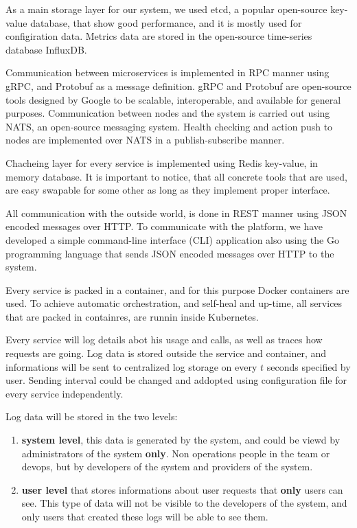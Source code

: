 As a main storage layer for our system, we used etcd, a popular open-source key-value database, that show good performance, and it is mostly used for configiration data. Metrics data are stored in the open-source time-series database InfluxDB. 

Communication between microservices is implemented in RPC manner using gRPC, and Protobuf as a message definition. gRPC and Protobuf are open-source tools designed by Google to be scalable, interoperable, and available for general purposes. Communication between nodes and the system is carried out using NATS, an open-source messaging system. Health checking and action push to nodes are implemented over NATS in a publish-subscribe manner.

Chacheing layer for every service is implemented using Redis key-value, in memory database. It is important to notice, that all concrete tools that are used, are easy swapable for some other as long as they implement proper interface.

All communication with the outside world, is done in REST manner using JSON encoded messages over HTTP. To communicate with the platform, we have developed a simple command-line interface (CLI) application also using the Go programming language that sends JSON encoded messages over HTTP to the system.

Every service is packed in a container, and for this purpose Docker containers are used. To achieve automatic orchestration, and self-heal and up-time, all services that are packed in containres, are runnin inside Kubernetes.

Every service will log details abot his usage and calls, as well as traces how requests are going. Log data is stored outside the service and container, and informations will be sent to centralized log storage on every $t$ seconds specified by user. Sending interval could be changed and addopted using configuration file for every service independently.

Log data will be stored in the two levels:

\begin{enumerate}[start=1,label={(\bfseries \arabic*)}]
	\item \textbf{system level}, this data is generated by the system, and could be viewd by administrators of the system \textbf{only}. Non operations people in the team or devops, but by developers of the system and providers of the system.
	\item \textbf{user level} that stores informations about user requests that \textbf{only} users can see. This type of data will not be visible to the developers of the system, and only users that created these logs will be able to see them.
\end{enumerate}

